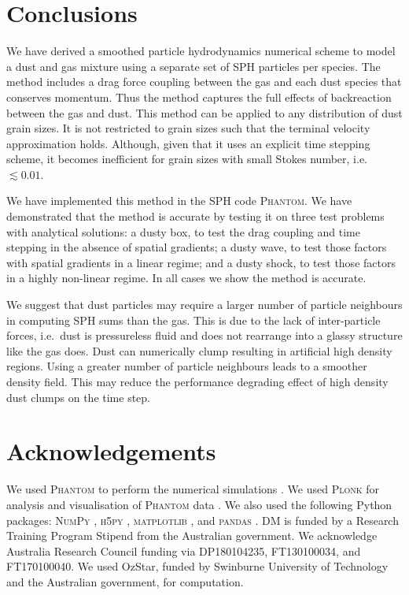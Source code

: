 \documentclass[fleqn,usenatbib]{mnras}
\begin{document}
\section{Conclusions}

We have derived a smoothed particle hydrodynamics numerical scheme to model a
dust and gas mixture using a separate set of SPH particles per species. The
method includes a drag force coupling between the gas and each dust species that
conserves momentum. Thus the method captures the full effects of backreaction
between the gas and dust. This method can be applied to any distribution of dust
grain sizes. It is not restricted to grain sizes such that the terminal velocity
approximation holds. Although, given that it uses an explicit time stepping
scheme, it becomes inefficient for grain sizes with small Stokes number, i.e.
\(\lesssim 0.01\).

We have implemented this method in the SPH code \textsc{Phantom}. We have
demonstrated that the method is accurate by testing it on three test problems
with analytical solutions: a dusty box, to test the drag coupling and time
stepping in the absence of spatial gradients; a dusty wave, to test those
factors with spatial gradients in a linear regime; and a dusty shock, to test
those factors in a highly non-linear regime. In all cases we show the method is
accurate.

We suggest that dust particles may require a larger number of particle
neighbours in computing SPH sums than the gas. This is due to the lack of
inter-particle forces, i.e.\ dust is pressureless fluid and does not rearrange
into a glassy structure like the gas does. Dust can numerically clump resulting
in artificial high density regions. Using a greater number of particle
neighbours leads to a smoother density field. This may reduce the performance
degrading effect of high density dust clumps on the time step.


\section*{Acknowledgements}

We used \textsc{Phantom} to perform the numerical simulations
\citep{Price2018PASA...35...31P}. We used \textsc{Plonk} for analysis and
visualisation of \textsc{Phantom} data \citep{Mentiplay2019JOSS....4.1884M}. We
also used the following Python packages: \textsc{NumPy} \citep{Oliphant2006,
van-der-Walt2011CSE....13b..22V}, \textsc{h5py} \citep{Collette2013},
\textsc{matplotlib} \citep{Hunter2007CSE.....9...90H}, and \textsc{pandas}
\citep{McKinney2010}. DM is funded by a Research Training Program Stipend from
the Australian government. We acknowledge Australia Research Council funding via
DP180104235, FT130100034, and FT170100040. We used OzStar, funded by Swinburne
University of Technology and the Australian government, for computation.
\end{document}
